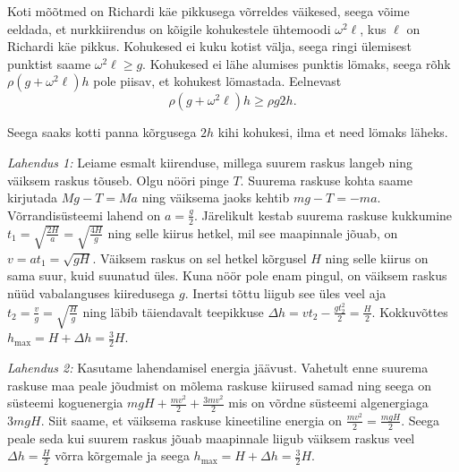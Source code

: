 \documentclass[10pt]{article}
\begin{document}
\setAuthor{}

\solu
Koti mõõtmed on Richardi käe pikkusega võrreldes väikesed, seega võime eeldada, et nurkkiirendus on kõigile kohukestele ühtemoodi $\omega^2 \ell$, kus $\ell$ on Richardi käe pikkus. Kohukesed ei kuku kotist välja, seega ringi ülemisest punktist saame $\omega^2\ell\geq g$. Kohukesed ei lähe alumises punktis lömaks, seega rõhk $\rho (g+\omega^2 \ell) h$ pole piisav, et kohukest lömastada. Eelnevast
\[\rho (g+\omega^2 \ell) h\geq \rho g 2h.\]

Seega saaks kotti panna kõrgusega $2h$ kihi kohukesi, ilma et need lömaks läheks.
\probend
\bigskip


\solu
\emph{Lahendus 1:} Leiame esmalt kiirenduse, millega suurem raskus langeb ning väiksem raskus tõuseb. Olgu nööri pinge $T$. Suurema raskuse kohta saame kirjutada $Mg-T=Ma$ ning väiksema jaoks kehtib $mg-T=-ma$. Võrrandisüsteemi lahend on $a=\frac{g}{2}$. Järelikult kestab suurema raskuse kukkumine $t_1=\sqrt{\frac{2H}{a}}=\sqrt{\frac{4H}{g}}$ ning selle kiirus hetkel, mil see maapinnale jõuab, on $v=at_1=\sqrt{gH}$. Väiksem raskus on sel hetkel kõrgusel $H$ ning selle kiirus on sama suur, kuid suunatud üles. Kuna nöör pole enam pingul, on väiksem raskus nüüd vabalanguses kiiredusega $g$. Inertsi tõttu liigub see üles veel aja $t_2=\frac{v}{g}=\sqrt{\frac{H}{g}}$ ning läbib täiendavalt teepikkuse $\Delta h=vt_2-\frac{gt^2_2}{2}=\frac{H}{2}$. Kokkuvõttes $h_\text{max}=H+\Delta h=\frac{3}{2}H$.

\emph{Lahendus 2:} Kasutame lahendamisel energia jäävust. Vahetult enne suurema raskuse maa peale jõudmist on mõlema raskuse kiirused samad ning seega on süsteemi koguenergia $mgH+\frac{mv^2}{2}+\frac{3mv^2}{2}$ mis on võrdne süsteemi algenergiaga $3mgH$. Siit saame, et väiksema raskuse kineetiline energia on $\frac{mv^2}{2}=\frac{mgH}{2}$. Seega peale seda kui suurem raskus jõuab maapinnale liigub väiksem raskus veel $\Delta h = \frac{H}{2}$ võrra kõrgemale ja seega $h_\text{max}=H+\Delta h=\frac{3}{2}H$.
\probend
\bigskip

\end{document}
